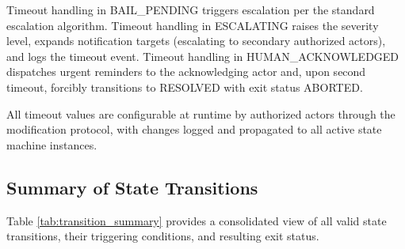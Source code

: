 \begin{algorithm}[htbp]
\caption{Timeout Monitor Algorithm}
\label{alg:timeout_monitor}
\end{algorithm}

Timeout handling in BAIL\_PENDING triggers escalation per the standard escalation algorithm. Timeout handling in ESCALATING raises the severity level, expands notification targets (escalating to secondary authorized actors), and logs the timeout event. Timeout handling in HUMAN\_ACKNOWLEDGED dispatches urgent reminders to the acknowledging actor and, upon second timeout, forcibly transitions to RESOLVED with exit status ABORTED.

All timeout values are configurable at runtime by authorized actors through the modification protocol, with changes logged and propagated to all active state machine instances.

\subsection{Summary of State Transitions}

Table \ref{tab:transition_summary} provides a consolidated view of all valid state transitions, their triggering conditions, and resulting exit status.

